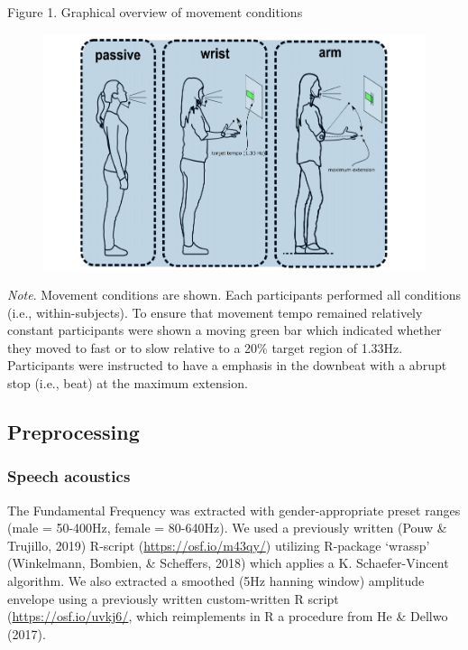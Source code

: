 \documentclass[
  man,floatsintext]{apa6}
\begin{document}
Figure 1. Graphical overview of movement conditions

\begin{figure}

{\centering \includegraphics{GS_physics_in_fluid_speech_files/figure-latex/method_stance_pic-1} 

}

\end{figure}

\emph{Note}. Movement conditions are shown. Each participants performed all conditions (i.e., within-subjects). To ensure that movement tempo remained relatively constant participants were shown a moving green bar which indicated whether they moved to fast or to slow relative to a 20\% target region of 1.33Hz. Participants were instructed to have a emphasis in the downbeat with a abrupt stop (i.e., beat) at the maximum extension.

\hypertarget{preprocessing}{%
\subsection{Preprocessing}\label{preprocessing}}

\hypertarget{speech-acoustics}{%
\subsubsection{Speech acoustics}\label{speech-acoustics}}

The Fundamental Frequency was extracted with gender-appropriate preset ranges (male = 50-400Hz, female = 80-640Hz). We used a previously written (Pouw \& Trujillo, 2019) R-script (\url{https://osf.io/m43qy/}) utilizing R-package `wrassp' (Winkelmann, Bombien, \& Scheffers, 2018) which applies a K. Schaefer-Vincent algorithm. We also extracted a smoothed (5Hz hanning window) amplitude envelope using a previously written custom-written R script (\url{https://osf.io/uvkj6/}, which reimplements in R a procedure from He \& Dellwo (2017).
\end{document}
